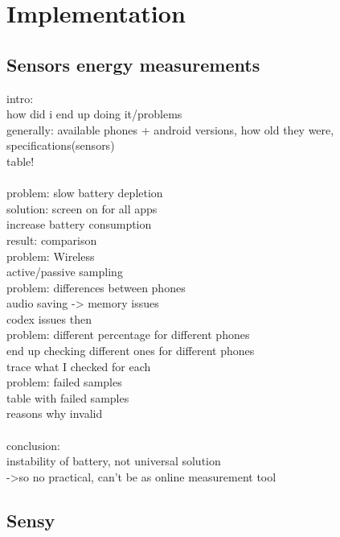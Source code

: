 \section{Implementation}
\label{s:implementation}
\subsection{Sensors energy measurements}
intro:\\
	how did i end up doing it/problems\\
	generally: available phones + android versions, how old they were, specifications(sensors)\\
		table!\\
\\
problem: slow battery depletion\\
	solution: screen on for all apps\\
		increase battery consumption\\
	result: comparison\\
problem: Wireless\\
	active/passive sampling\\
problem: differences between phones\\
	audio saving -> memory issues\\
		codex issues then\\
problem: different percentage for different phones\\
	end up checking different ones for different phones\\
		trace what I checked for each\\
problem: failed samples\\
	table with failed samples\\
	reasons why invalid\\
\\
conclusion:\\
	instability of battery, not universal solution\\
		->so no practical, can't be as online measurement tool\\

\subsection{Sensy}